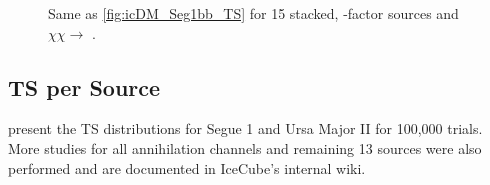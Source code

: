 \begin{figure}
    \caption{Same as \cref{fig:icDM_Seg1bb_TS} for 15 stacked, \GS \J-factor sources and $\chi\chi \rightarrow$ \parpar{\nu_\mu}.}
    \label{fig:icDM_stact_numu_TS}
\end{figure}

\subsection{TS per Source} \label{sec:icDM_TSperSrc}

 present the TS distributions for Segue 1 and Ursa Major II for 100,000 trials.
More studies for all annihilation channels and remaining 13 sources were also performed and are documented in IceCube's internal wiki.

